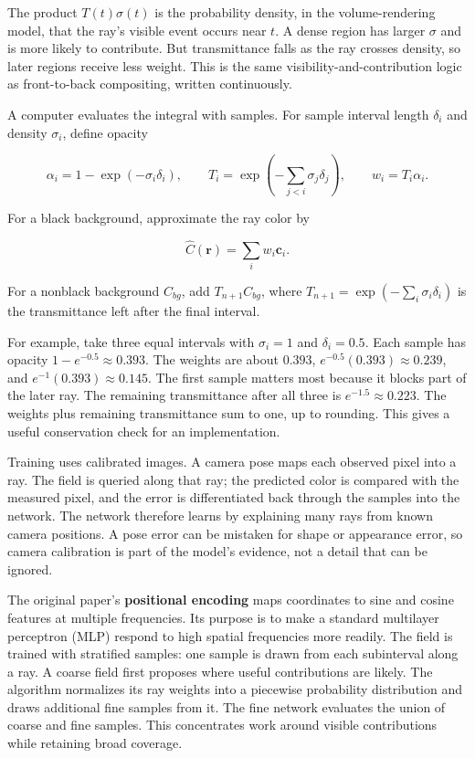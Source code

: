 The product \(T(t)\sigma(t)\) is the probability density, in the volume-rendering model, that the ray's visible event occurs near \(t\). A dense region has larger \(\sigma\) and is more likely to contribute. But transmittance falls as the ray crosses density, so later regions receive less weight. This is the same visibility-and-contribution logic as front-to-back compositing, written continuously.

A computer evaluates the integral with samples. For sample interval length \(\delta_i\) and density \(\sigma_i\), define opacity

\[\alpha_i=1-\exp(-\sigma_i\delta_i),\qquad T_i=\exp\left(-\sum_{j<i}\sigma_j\delta_j\right),\qquad w_i=T_i\alpha_i.\]

For a black background, approximate the ray color by

\[\widehat C(\mathbf{r})=\sum_i w_i\mathbf{c}_i.\]

For a nonblack background \(C_{bg}\), add \(T_{n+1}C_{bg}\), where \(T_{n+1}=\exp(-\sum_i\sigma_i\delta_i)\) is the transmittance left after the final interval.

For example, take three equal intervals with \(\sigma_i=1\) and \(\delta_i=0.5\). Each sample has opacity \(1-e^{-0.5}\approx0.393\). The weights are about \(0.393\), \(e^{-0.5}(0.393)\approx0.239\), and \(e^{-1}(0.393)\approx0.145\). The first sample matters most because it blocks part of the later ray. The remaining transmittance after all three is \(e^{-1.5}\approx0.223\). The weights plus remaining transmittance sum to one, up to rounding. This gives a useful conservation check for an implementation.

Training uses calibrated images. A camera pose maps each observed pixel into a ray. The field is queried along that ray; the predicted color is compared with the measured pixel, and the error is differentiated back through the samples into the network. The network therefore learns by explaining many rays from known camera positions. A pose error can be mistaken for shape or appearance error, so camera calibration is part of the model's evidence, not a detail that can be ignored.

The original paper's \textbf{positional encoding} maps coordinates to sine and cosine features at multiple frequencies. Its purpose is to make a standard multilayer perceptron (MLP) respond to high spatial frequencies more readily. The field is trained with stratified samples: one sample is drawn from each subinterval along a ray. A coarse field first proposes where useful contributions are likely. The algorithm normalizes its ray weights into a piecewise probability distribution and draws additional fine samples from it. The fine network evaluates the union of coarse and fine samples. This concentrates work around visible contributions while retaining broad coverage.

